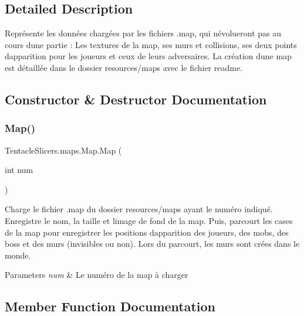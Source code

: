 \subsection{Detailed Description}
Représente les données chargées par les fichiers .map, qui n\textquotesingle{}évolueront pas au cours d\textquotesingle{}une partie \+: Les textures de la map, ses murs et collisions, ses deux points d\textquotesingle{}apparition pour les joueurs et ceux de leurs adversaires. La création d\textquotesingle{}une map est détaillée dans le dossier resources/maps avec le fichier readme. 



\subsection{Constructor \& Destructor Documentation}
\mbox{\label{class_tentacle_slicers_1_1maps_1_1_map_a277eb8c716c31557142ab758f8c1c701}} 
\subsubsection{\texorpdfstring{Map()}{Map()}}
{\footnotesize\ttfamily Tentacle\+Slicers.\+maps.\+Map.\+Map (\begin{DoxyParamCaption}\item[{int}]{num }\end{DoxyParamCaption})}



Charge le fichier .map du dossier resources/maps ayant le numéro indiqué. Enregistre le nom, la taille et l\textquotesingle{}image de fond de la map. Puis, parcourt les cases de la map pour enregistrer les positions d\textquotesingle{}apparition des joueurs, des mobs, des boss et des murs (invisibles ou non). Lors du parcourt, les murs sont crées dans le monde. 


\begin{DoxyParams}{Parameters}
{\em num} & Le numéro de la map à charger \\
\hline
\end{DoxyParams}


\subsection{Member Function Documentation}
\mbox{\label{class_tentacle_slicers_1_1maps_1_1_map_ac3ae7e9bb364c2cdf5d718315dd3fc3f}} 
